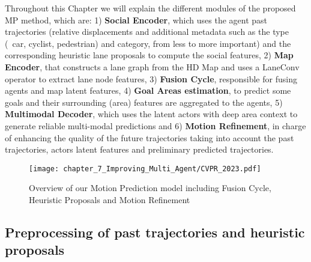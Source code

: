 Throughout this Chapter we will explain the different modules of the proposed \ac{MP} method, which are: 1) \textbf{Social Encoder}, which uses the agent past trajectories (relative displacements and additional metadata such as the type (\eg \ car, cyclist, pedestrian) and category, from less to more important) and the corresponding heuristic lane proposals to compute the social features, 2) \textbf{Map Encoder}, that constructs a lane graph from the HD Map and uses a LaneConv operator \cite{liang2020learning} to extract lane node features, 3) \textbf{Fusion Cycle}, responsible for fusing agents and map latent features, 4) \textbf{Goal Areas estimation}, to predict some goals and their surrounding  (area) features are aggregated to the agents, 5) \textbf{Multimodal Decoder}, which uses the latent actors with deep area context to generate reliable multi-modal predictions and 6) \textbf{Motion Refinement}, in charge of enhancing the quality of the future trajectories taking into account the past trajectories, actors latent features and preliminary predicted trajectories.

\begin{figure}[h] 
	\centering
	\texttt{[image: chapter\_7\_Improving\_Multi\_Agent/CVPR\_2023.pdf]}
	\caption{Overview of our Motion Prediction model including Fusion Cycle, Heuristic Proposals and Motion Refinement}
	\label{fig:chapter_7_Improving_Multi_Agent/CVPR_2023.pdf}
\end{figure}

\subsection{Preprocessing of past trajectories and heuristic proposals}
\label{subsec:7_improving_efficiency_preprocessing}

